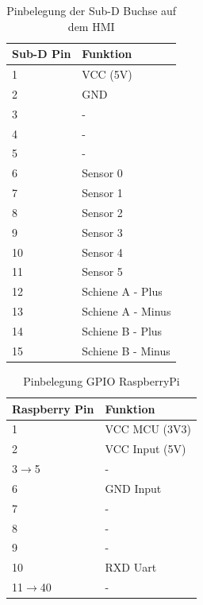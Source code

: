 \documentclass[a4paper, 11pt]{report}
\begin{document}
	\begin{table}[H]
	\centering
		\begin{tabular}{|l|l|}
			\hline
			\textbf{Sub-D Pin} &\textbf{Funktion}\\
			\hline
			\hline
			1 & VCC (5V)\\
			\hline
			2 & GND\\
			\hline
			3 & -\\
			\hline
			4 & -\\
			\hline
			5 & -\\
			\hline
			6 & Sensor 0\\
			\hline
			7 & Sensor 1\\
			\hline
			8 & Sensor 2\\
			\hline
			9 & Sensor 3\\
			\hline
			10 & Sensor 4\\
			\hline
			11 & Sensor 5\\
			\hline
			12 & Schiene A - Plus\\
			\hline
			13 & Schiene A - Minus\\
			\hline
			14 & Schiene B - Plus\\
			\hline
			15 & Schiene B - Minus\\
			\hline
		\end{tabular}
		\caption{Pinbelegung der Sub-D Buchse auf dem HMI}
		\label{tab:AnhangBelegungSUBD}
	\end{table}

	\begin{table}[H]
	\centering
		\begin{tabular}{|l|l|}
			\hline
			\textbf{Raspberry Pin} &\textbf{Funktion}\\
			\hline
			\hline
			1 & VCC MCU (3V3)\\
			\hline
			2 & VCC Input (5V)\\
			\hline
			3$\rightarrow$5 & -\\
			\hline
			6 & GND Input\\
			\hline
			7 & -\\
			\hline
			8 & -\\
			\hline
			9 & -\\
			\hline
			10 & RXD Uart\\
			\hline
			11$\rightarrow$40 & -\\
			\hline
		\end{tabular}
		\caption{Pinbelegung GPIO RaspberryPi}
		\label{tab:AnhangBelegungRPI}
	\end{table}
\end{document}
